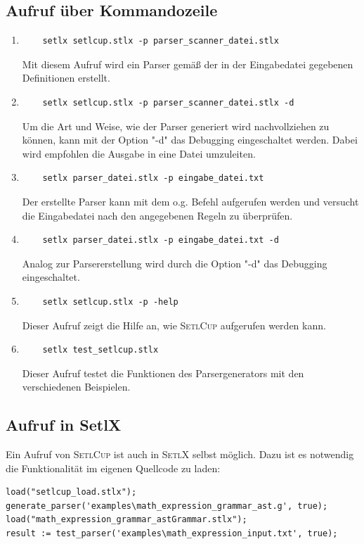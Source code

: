 \subsection{Aufruf über Kommandozeile}
\begin{enumerate}
	\item \begin{Verbatim}
	setlx setlcup.stlx -p parser_scanner_datei.stlx
	\end{Verbatim}
			Mit diesem Aufruf wird ein Parser gemäß der in der Eingabedatei gegebenen Definitionen erstellt.
	\item \begin{Verbatim}
	setlx setlcup.stlx -p parser_scanner_datei.stlx -d
	\end{Verbatim}
			Um die Art und Weise, wie der Parser generiert wird nachvollziehen zu können, kann mit der Option "-d" das Debugging eingeschaltet werden. Dabei wird empfohlen die Ausgabe in eine Datei umzuleiten.
	\item \begin{Verbatim}
	setlx parser_datei.stlx -p eingabe_datei.txt
	\end{Verbatim}
	Der erstellte Parser kann mit dem o.g. Befehl aufgerufen werden und versucht die Eingabedatei nach den angegebenen Regeln zu überprüfen.
		\item \begin{Verbatim}
	setlx parser_datei.stlx -p eingabe_datei.txt -d
	\end{Verbatim}
	Analog zur Parsererstellung wird durch die Option "-d" das Debugging eingeschaltet.
	\item \begin{Verbatim}
	setlx setlcup.stlx -p -help
	\end{Verbatim}
			Dieser Aufruf zeigt die Hilfe an, wie \textsc{SetlCup} aufgerufen werden kann.
	\item \begin{Verbatim}
	setlx test_setlcup.stlx
	\end{Verbatim}
			Dieser Aufruf testet die Funktionen des Parsergenerators mit den verschiedenen Beispielen.
\end{enumerate}
\subsection{Aufruf in SetlX}
Ein Aufruf von \textsc{SetlCup} ist auch in \textsc{SetlX} selbst möglich. Dazu ist es notwendig die Funktionalität im eigenen Quellcode zu laden:
\begin{Verbatim}
load("setlcup_load.stlx");
generate_parser('examples\math_expression_grammar_ast.g', true);
load("math_expression_grammar_astGrammar.stlx");
result := test_parser('examples\math_expression_input.txt', true);
\end{Verbatim}
